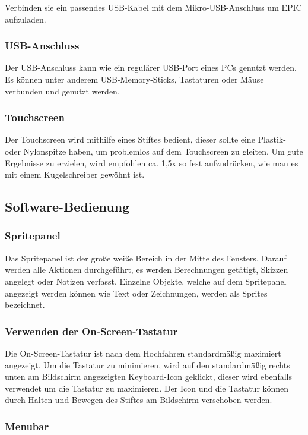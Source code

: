 Verbinden sie ein passendes USB-Kabel mit dem Mikro-USB-Anschluss um EPIC aufzuladen. 

\subsubsection{USB-Anschluss}

Der USB-Anschluss kann wie ein regulärer USB-Port eines PCs genutzt werden. Es können unter anderem USB-Memory-Sticks, Tastaturen oder Mäuse verbunden und genutzt werden.

\subsubsection{Touchscreen}

Der Touchscreen wird mithilfe eines Stiftes bedient, dieser sollte eine Plastik- oder Nylonspitze haben, um problemlos auf dem Touchscreen zu gleiten. Um gute Ergebnisse zu erzielen, wird empfohlen ca. 1,5x so fest aufzudrücken, wie man es mit einem Kugelschreiber gewöhnt ist. 

\subsection{Software-Bedienung}

\subsubsection{Spritepanel}
Das Spritepanel ist der große weiße Bereich in der Mitte des Fensters. Darauf werden alle Aktionen durchgeführt, es werden Berechnungen getätigt, Skizzen angelegt oder Notizen verfasst. Einzelne Objekte, welche auf dem Spritepanel angezeigt werden können wie Text oder Zeichnungen, werden als Sprites bezeichnet.

\subsubsection{Verwenden der On-Screen-Tastatur}

Die On-Screen-Tastatur ist nach dem Hochfahren standardmäßig maximiert angezeigt. Um die Tastatur zu minimieren, wird auf den standardmäßig rechts unten am Bildschirm angezeigten Keyboard-Icon geklickt, dieser wird ebenfalls verwendet um die Tastatur zu maximieren. Der Icon und die Tastatur können durch Halten und Bewegen des Stiftes am Bildschirm verschoben werden.


\subsubsection{Menubar}

